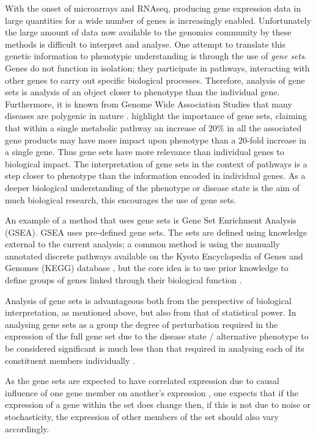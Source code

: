 \documentclass[12pt]{article} %
\begin{document}
	With the onset of microarrays and RNAseq, producing gene expression data in large quantities for a wide number of genes is increasingly enabled. Unfortunately the large amount of data now available to the genomics community by these methods is difficult to interpret and analyse. One attempt to translate this genetic information to phenotypic understanding is through the use of \emph{gene sets}. Genes do not function in isolation; they participate in pathways, interacting with other genes to carry out specific biological processes. Therefore, analysis of gene sets is analysis of an object closer to phenotype than the individual gene. Furthermore, it is known from Genome Wide Association Studies that many diseases are polygenic in nature \citep{MooneyGenesetanalysis2015}. \citet{SubramanianGenesetenrichment2005a} highlight the importance of gene sets, claiming that within a single metabolic pathway an increase of $20\%$ in all the associated gene products may have more impact upon phenotype than a 20-fold increase in a single gene.  Thus gene sets have more relevance than individual genes to biological impact. The interpretation of gene sets in the context of pathways is a step closer to phenotype than the information encoded in individual genes. As a deeper biological understanding of the phenotype or disease state is the aim of much biological research, this encourages the use of gene sets.
	
	An example of a method that uses gene sets is Gene Set Enrichment Analysis (GSEA). GSEA uses pre-defined gene sets. The sets are defined using knowledge external to the current analysis; a common method is using the manually annotated discrete pathways available on the Kyoto Encyclopedia of Genes and Genomes (KEGG) database \citep{FridleyGenesetanalysis2011}, but the core idea is to use prior knowledge to define groups of genes linked through their biological function \citep{HejblumTimeCourseGeneSet2015}. 
	
	Analysis of gene sets is advantageous both from the perspective of biological interpretation, as mentioned above, but also from that of statistical power. In analysing gene sets as a group the degree of perturbation required in the expression of the full gene set due to the disease state / alternative phenotype to be considered significant is much less than that required in analysing each of its constituent members individually \citep{DudbridgePowerPredictiveAccuracy2013, WrayResearchReviewPolygenic2014, MooneyGenesetanalysis2015}.
	
	As the gene sets are expected to have correlated expression due to causal influence of one gene member on another's expression \citep{WeirauchGeneCoexpressionNetworks2011}, one expects that if the expression of a gene within the set does change then, if this is not due to noise or stochasticity, the expression of other members of the set should also vary accordingly.
	
\end{document}
